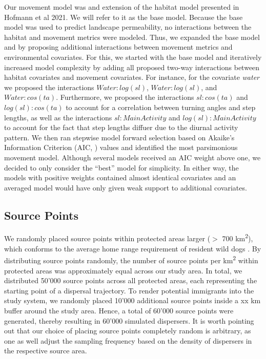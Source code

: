 \documentclass[abstract=on,10pt,a4paper,bibliography=totocnumbered]{article}
\begin{document}
Our movement model was and extension of the habitat model presented in Hofmann
et al 2021. We will refer to it as the base model. Because the base model was
used to predict landscape permeability, no interactions between the habitat and
movement metrics were modeled. Thus, we expanded the base model and by proposing
additional interactions between movement metrics and environmental covariates.
For this, we started with the base model and iteratively increased model
complexity by adding all proposed two-way interactions between habitat
covariates and movement covariates. For instance, for the covariate
\textit{water} we proposed the interactions \(Water:log(sl)\),
\(Water:log(sl)\), and \(Water:cos(ta)\). Furthermore, we proposed the
interactions \(sl:cos(ta)\) and \(log(sl):cos(ta)\) to account for a correlation
between turning angles and step lengths, as well as the interactions
\(sl:MainActivity\) and \(log(sl):MainActivity\) to account for the fact that
step lengths diffuer due to the diurnal activity pattern. We then ran stepwise
model forward selection based on Akaike's Information Criterion (AIC,
\citealp{Burnham.2002}) values and identified the most parsimonious movement
model. Although several models received an AIC weight above one, we decided to
only consider the  ``best'' model for simplicity. In either way, the models with
positive weights contained almost identical covariates and an averaged model
would have only given weak support to additional covariates.

\subsection{Source Points}
We randomly placed source points within protected areas larger (\(>\) 700
km\textsuperscript{2}), which conforms to the average home range requirement of
resident wild dogs \citep{Pomilia.2015}. By distributing source points randomly,
the number of source points per km\textsuperscript{2} within protected areas was
approximately equal across our study area. In total, we distributed 50'000
source points across all protected areas, each representing the starting point
of a dispersal trajectory. To render potential immigrants into the study system,
we randomly placed 10'000 additional source points inside a xx km buffer around
the study area. Hence, a total of 60'000 source points were generated, thereby
resulting in 60'000 simulated dispersers. It is worth pointing out that our
choice of  placing source points completely random is arbitrary, as one as well
adjust the sampling frequency based on the density of dispersers in the
respective source area.
\end{document}

